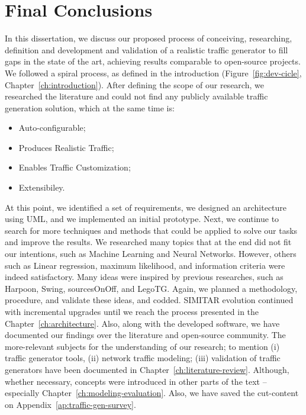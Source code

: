 \chapter{Final Conclusions}\label{ch:conclusion}



In this dissertation, we discuss our proposed process of conceiving, researching, definition and development and validation of a realistic traffic generator to fill gaps in the state of the art,  achieving results comparable to open-source projects.  We followed a spiral process, as defined in the introduction (Figure~\ref{fig:dev-cicle},  Chapter~\ref{ch:introduction}).  After defining the scope of our research, we researched the literature and could not find any publicly available traffic generation solution, which  at the same time is:

\begin{itemize}
\item Auto-configurable;
\item Produces Realistic Traffic;
\item Enables Traffic Customization;
\item Extensibiley.
\end{itemize}

At this point, we identified a set of  requirements,  we designed an architecture using UML,  and we implemented  an initial prototype. Next, we continue to search for more techniques and methods that could be applied to solve our tasks and improve the results.  We researched many topics that at the end did not fit our intentions, such as Machine Learning and Neural Networks. However, others such as Linear regression, maximum likelihood, and information criteria were indeed satisfactory. Many ideas were inspired by previous researches, such as Harpoon, Swing, sourcesOnOff, and LegoTG.  Again, we planned a methodology, procedure, and validate these ideas, and codded.  SIMITAR evolution continued with incremental upgrades until we reach the process presented in the Chapter~\ref{ch:architecture}. Also, along with the developed software, we have documented our findings over the literature and open-source community. The more-relevant subjects for the understanding of our research; to mention (i) traffic generator tools, (ii) network traffic modeling; (iii) validation of traffic generators have been documented in Chapter~\ref{ch:literature-review}. Although, whether necessary, concepts were introduced in other parts of the text -- especially Chapter~\ref{ch:modeling-evaluation}.  Also, we have saved the cut-content on Appendix~\ref{ap:traffic-gen-survey}. 


